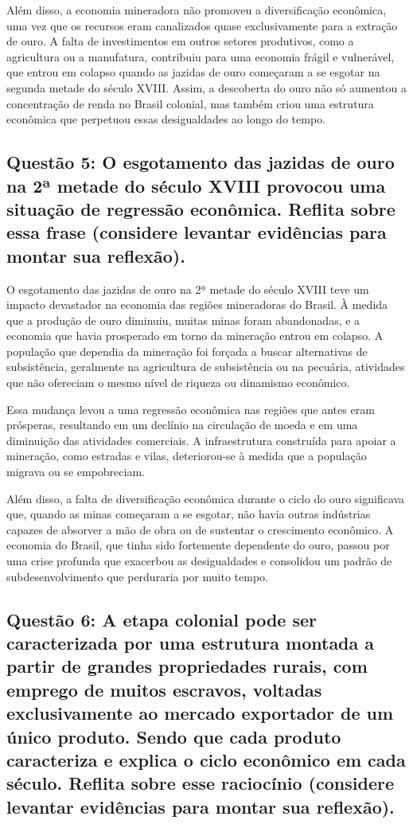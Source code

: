 \documentclass[a4paper,12pt]{article}[abntex2]
\begin{document}
Além disso, a economia mineradora não promoveu a diversificação econômica, uma vez que os recursos eram canalizados quase exclusivamente para a extração de ouro. A falta de investimentos em outros setores produtivos, como a agricultura ou a manufatura, contribuiu para uma economia frágil e vulnerável, que entrou em colapso quando as jazidas de ouro começaram a se esgotar na segunda metade do século XVIII. Assim, a descoberta do ouro não só aumentou a concentração de renda no Brasil colonial, mas também criou uma estrutura econômica que perpetuou essas desigualdades ao longo do tempo.

\subsection{\textbf{Questão 5: O esgotamento das jazidas de ouro na 2ª metade do século XVIII provocou uma situação de regressão econômica. Reflita sobre essa frase (considere levantar evidências para montar sua reflexão).}}

O esgotamento das jazidas de ouro na 2ª metade do século XVIII teve um impacto devastador na economia das regiões mineradoras do Brasil. À medida que a produção de ouro diminuiu, muitas minas foram abandonadas, e a economia que havia prosperado em torno da mineração entrou em colapso. A população que dependia da mineração foi forçada a buscar alternativas de subsistência, geralmente na agricultura de subsistência ou na pecuária, atividades que não ofereciam o mesmo nível de riqueza ou dinamismo econômico.

Essa mudança levou a uma regressão econômica nas regiões que antes eram prósperas, resultando em um declínio na circulação de moeda e em uma diminuição das atividades comerciais. A infraestrutura construída para apoiar a mineração, como estradas e vilas, deteriorou-se à medida que a população migrava ou se empobreciam.

Além disso, a falta de diversificação econômica durante o ciclo do ouro significava que, quando as minas começaram a se esgotar, não havia outras indústrias capazes de absorver a mão de obra ou de sustentar o crescimento econômico. A economia do Brasil, que tinha sido fortemente dependente do ouro, passou por uma crise profunda que exacerbou as desigualdades e consolidou um padrão de subdesenvolvimento que perduraria por muito tempo.

\subsection{\textbf{Questão 6: A etapa colonial pode ser caracterizada por uma estrutura montada a partir de grandes propriedades rurais, com emprego de muitos escravos, voltadas exclusivamente ao mercado exportador de um único produto. Sendo que cada produto caracteriza e explica o ciclo econômico em cada século. Reflita sobre esse raciocínio (considere levantar evidências para montar sua reflexão).}}
\end{document}
